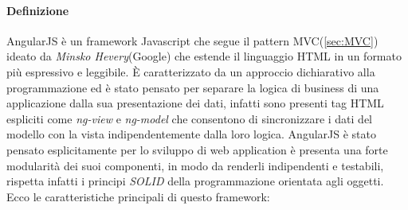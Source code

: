\paragraph*{Definizione}
AngularJS è un framework Javascript che segue il pattern MVC(\ref{sec:MVC}) ideato da \emph{Minsko Hevery}(Google) che estende il linguaggio HTML in un formato più espressivo e leggibile. È caratterizzato da un approccio dichiarativo alla programmazione ed è stato pensato per separare la logica di business di una applicazione dalla sua presentazione dei dati, infatti sono presenti tag HTML espliciti come \emph{ng-view} e \emph{ng-model} che consentono di sincronizzare i dati del modello con la vista indipendentemente dalla loro logica. AngularJS è stato pensato esplicitamente per lo sviluppo di web application è presenta una forte modularità dei suoi componenti, in modo da renderli indipendenti e testabili, rispetta infatti i principi \emph{SOLID} della programmazione orientata agli oggetti.
Ecco le caratteristiche principali di questo framework:

